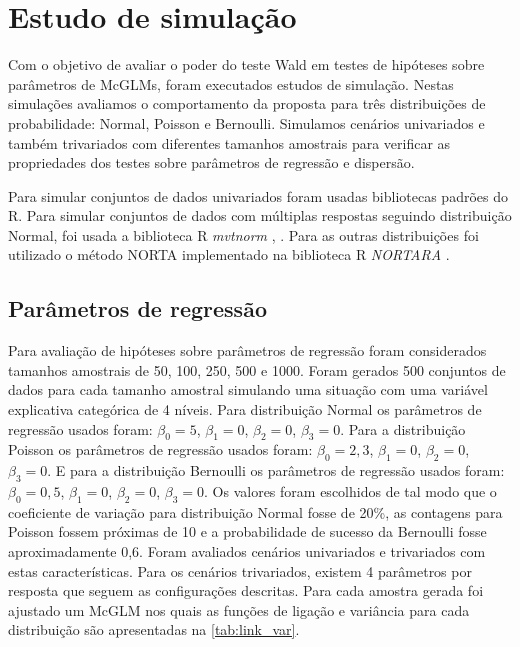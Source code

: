 
\chapter{Estudo de simulação}\label{cap:simulacao}


Com o objetivo de avaliar o poder do teste Wald em testes de hipóteses sobre parâmetros de McGLMs, foram executados estudos de simulação. Nestas simulações avaliamos o comportamento da proposta para três distribuições de probabilidade: Normal, Poisson e Bernoulli. Simulamos cenários univariados e também trivariados com diferentes tamanhos amostrais para verificar as propriedades dos testes sobre parâmetros de regressão e dispersão.

Para simular conjuntos de dados univariados foram usadas bibliotecas padrões do R. Para simular conjuntos de dados com múltiplas respostas seguindo distribuição Normal, foi usada a biblioteca R \emph{mvtnorm} \citep{mvtnorm1}, \citep{mvtnorm2}. Para as outras distribuições foi utilizado o método NORTA \citep{cario1997modeling} implementado na biblioteca R \emph{NORTARA} \citep{nortara}.

\section{Parâmetros de regressão}

Para avaliação de hipóteses sobre parâmetros de regressão foram considerados tamanhos amostrais de 50, 100, 250, 500 e 1000. Foram gerados 500 conjuntos de dados para cada tamanho amostral simulando uma situação com uma variável explicativa categórica de 4 níveis. Para distribuição Normal os parâmetros de regressão usados foram: $\beta_0 = 5$, $\beta_1 = 0$, $\beta_2 = 0$, $\beta_3 = 0$. Para a distribuição Poisson os parâmetros de regressão usados foram: $\beta_0 = 2,3$, $\beta_1 = 0$, $\beta_2 = 0$, $\beta_3 = 0$. E para a distribuição Bernoulli os parâmetros de regressão usados foram: $\beta_0 = 0,5$, $\beta_1 = 0$, $\beta_2 = 0$, $\beta_3 = 0$. Os valores foram escolhidos de tal modo que o coeficiente de variação para distribuição Normal fosse de 20\%, as contagens para Poisson fossem próximas de 10 e a probabilidade de sucesso da Bernoulli fosse aproximadamente 0,6. Foram avaliados cenários univariados e trivariados com estas características. Para os cenários trivariados, existem 4 parâmetros por resposta que seguem as configurações descritas. Para cada amostra gerada foi ajustado um McGLM nos quais as funções de ligação e variância para cada distribuição são apresentadas na \autoref{tab:link_var}. 

